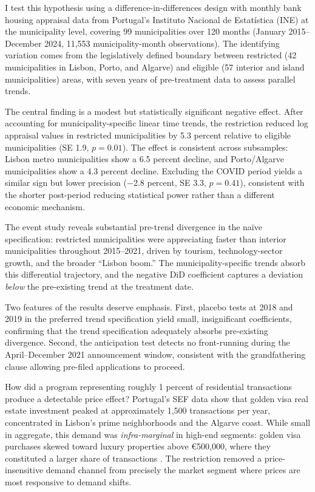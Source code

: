 \documentclass[12pt]{article}
\begin{document}
I test this hypothesis using a difference-in-differences design with monthly bank housing appraisal data from Portugal's Instituto Nacional de Estat\'{i}stica (INE) at the municipality level, covering 99 municipalities over 120 months (January 2015--December 2024, 11,553 municipality-month observations). The identifying variation comes from the legislatively defined boundary between restricted (42 municipalities in Lisbon, Porto, and Algarve) and eligible (57 interior and island municipalities) areas, with seven years of pre-treatment data to assess parallel trends.

The central finding is a modest but statistically significant negative effect. After accounting for municipality-specific linear time trends, the restriction reduced log appraisal values in restricted municipalities by 5.3 percent relative to eligible municipalities (SE 1.9, $p = 0.01$). The effect is consistent across subsamples: Lisbon metro municipalities show a 6.5 percent decline, and Porto/Algarve municipalities show a 4.3 percent decline. Excluding the COVID period yields a similar sign but lower precision ($-$2.8 percent, SE 3.3, $p = 0.41$), consistent with the shorter post-period reducing statistical power rather than a different economic mechanism.

The event study reveals substantial pre-trend divergence in the na\"{i}ve specification: restricted municipalities were appreciating faster than interior municipalities throughout 2015--2021, driven by tourism, technology-sector growth, and the broader ``Lisbon boom.'' The municipality-specific trends absorb this differential trajectory, and the negative DiD coefficient captures a deviation \textit{below} the pre-existing trend at the treatment date.

Two features of the results deserve emphasis. First, placebo tests at 2018 and 2019 in the preferred trend specification yield small, insignificant coefficients, confirming that the trend specification adequately absorbs pre-existing divergence. Second, the anticipation test detects no front-running during the April--December 2021 announcement window, consistent with the grandfathering clause allowing pre-filed applications to proceed.

How did a program representing roughly 1 percent of residential transactions produce a detectable price effect? Portugal's SEF data show that golden visa real estate investment peaked at approximately 1,500 transactions per year, concentrated in Lisbon's prime neighborhoods and the Algarve coast. While small in aggregate, this demand was \textit{infra-marginal} in high-end segments: golden visa purchases skewed toward luxury properties above \euro500,000, where they constituted a larger share of transactions \citep{dePereiraDosSantos2024}. The restriction removed a price-insensitive demand channel from precisely the market segment where prices are most responsive to demand shifts.
\end{document}
